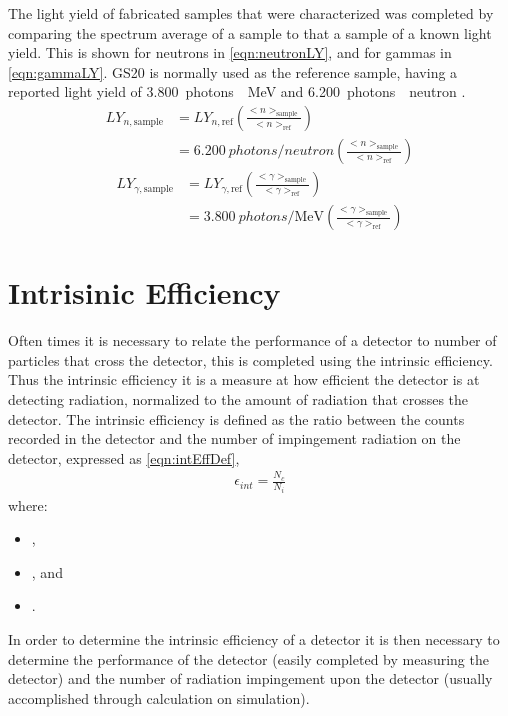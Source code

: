The light yield of fabricated samples that were characterized was completed by comparing the spectrum average of a sample to that a sample of a known light yield.
This is shown for neutrons in \eqref{eqn:neutronLY}, and for gammas in \eqref{eqn:gammaLY}.
GS20 is normally used as the reference sample, having a reported light yield of \SI{3,800}{photons \per\MeV} and \SI{6,200}{photons \per neutron} \cite{carel_w.e_inorganic-scintillator_2001,knoll_radiation_2009}.
\begin{align}
	LY_{n,\text{sample}} &= LY_{n,\text{ref}} \left( \frac{<n>_\text{sample}}{<n>_\text{ref} } \right )\\
	&= \SI{6,200}{photons\per neutron} \left( \frac{<n>_\text{sample}}{<n>_\text{ref} } \right )
	\label{eqn:neutronLY}
\end{align}
\begin{align}
	LY_{\gamma,\text{sample}} &= LY_{\gamma,\text{ref}} \left( \frac{<\gamma>_\text{sample}}{<\gamma>_\text{ref} } \right )\\
	&= \SI{3,800}{photons\per\MeV} \left( \frac{<\gamma>_\text{sample}}{<\gamma>_\text{ref} } \right )
	\label{eqn:gammaLY}
\end{align}

\section{Intrisinic Efficiency}
\label{sec:IntEff}

Often times it is necessary to relate the performance of a detector to number of particles that cross the detector, this is completed using the intrinsic efficiency.
Thus the intrinsic efficiency it is a measure at how efficient the detector is at detecting radiation, normalized to the amount of radiation that crosses the detector.
The intrinsic efficiency is defined as the ratio between the counts recorded in the detector and the number of impingement radiation on the detector\cite{knoll_radiation_2009}, expressed as \eqref{eqn:intEffDef},
\begin{align}
  \label{eqn:intEffDef}
  \epsilon_{int} = \frac{N_c}{N_i}
\end{align}
where:
\begin{itemize}
  \item[] ,
  \item[] , and
  \item[] .
\end{itemize}
In order to determine the intrinsic efficiency of a detector it is then necessary to determine the performance of the detector (easily completed by measuring the detector) and the number of radiation impingement upon the detector (usually accomplished through calculation on simulation).

